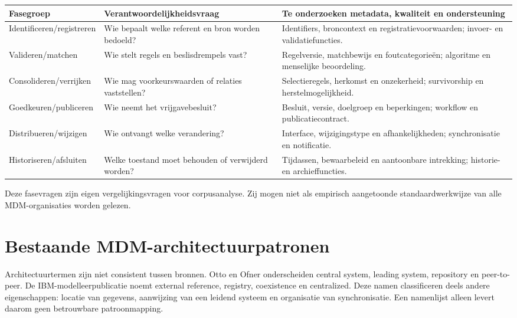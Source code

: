 \begin{longtable}{@{}P{.21\linewidth}P{.31\linewidth}P{.40\linewidth}@{}}
\toprule Fasegroep & Verantwoordelijkheidsvraag & Te onderzoeken metadata, kwaliteit en ondersteuning \\\midrule
Identificeren/\allowbreak registreren & Wie bepaalt welke referent en bron worden bedoeld? & Identifiers, broncontext en registratievoorwaarden; invoer- en validatiefuncties. \\
Valideren/\allowbreak matchen & Wie stelt regels en beslisdrempels vast? & Regelversie, matchbewijs en foutcategorieën; algoritme en menselijke beoordeling. \\
Consolideren/\allowbreak verrijken & Wie mag voorkeurswaarden of relaties vaststellen? & Selectieregels, herkomst en onzekerheid; survivorship en herstelmogelijkheid. \\
Goedkeuren/\allowbreak publiceren & Wie neemt het vrijgavebesluit? & Besluit, versie, doelgroep en beperkingen; workflow en publicatiecontract. \\
Distribueren/\allowbreak wijzigen & Wie ontvangt welke verandering? & Interface, wijzigingstype en afhankelijkheden; synchronisatie en notificatie. \\
Historiseren/\allowbreak afsluiten & Welke toestand moet behouden of verwijderd worden? & Tijdassen, bewaarbeleid en aantoonbare intrekking; historie- en archieffuncties. \\
\bottomrule
\end{longtable}
Deze fasevragen zijn eigen vergelijkingsvragen voor corpusanalyse. Zij mogen niet als empirisch aangetoonde standaardwerkwijze van alle MDM-organisaties worden gelezen.

\section{Bestaande MDM-architectuurpatronen}
Architectuurtermen zijn niet consistent tussen bronnen. Otto en Ofner onderscheiden central system, leading system, repository en peer-to-peer. De IBM-modelleerpublicatie noemt external reference, registry, coexistence en centralized. Deze namen classificeren deels andere eigenschappen: locatie van gegevens, aanwijzing van een leidend systeem en organisatie van synchronisatie. Een namenlijst alleen levert daarom geen betrouwbare patroonmapping. \parencite{L20,P01}

